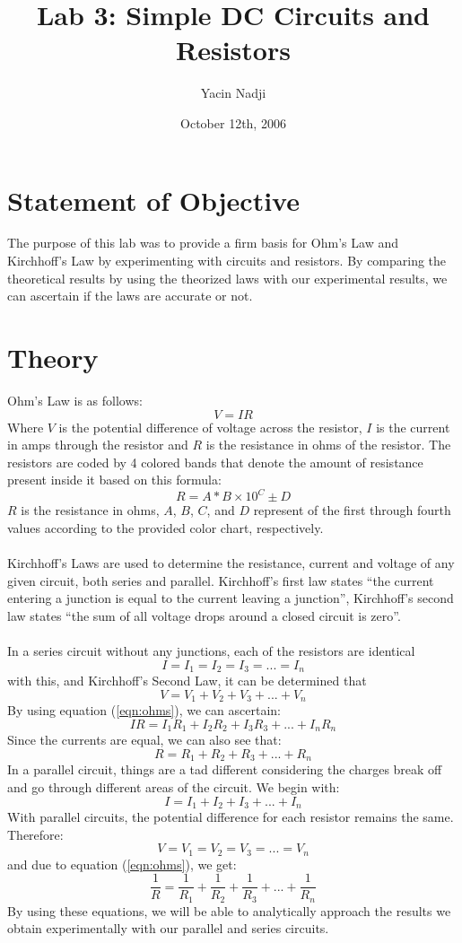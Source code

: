 \documentclass[titlepage]{article}
\title{Lab 3: Simple DC Circuits and Resistors}
\author{Yacin Nadji}
\date{October 12th, 2006}
\begin{document}
\maketitle

\section{Statement of Objective}\label{sec:obj}
The purpose of this lab was to provide a firm basis for Ohm's Law and Kirchhoff's Law by experimenting with circuits and resistors. By comparing the theoretical results by using the theorized laws with our experimental results, we can ascertain if the laws are accurate or not.

\section{Theory}\label{sec:theory}
Ohm's Law is as follows:
\begin{equation} \label{eqn:ohms}
	V = IR
\end{equation}
Where $V$ is the potential difference of voltage across the resistor, $I$ is the current in amps through the resistor and $R$ is the resistance in ohms of the resistor. The resistors are coded by 4 colored bands that denote the amount of resistance present inside it based on this formula:
\begin{equation}
	R = A * B \times 10^C \pm D%
\end{equation}
$R$ is the resistance in ohms, $A$, $B$, $C$, and $D$ represent of the first through fourth values according to the provided color chart, respectively.\\
\\
Kirchhoff's Laws are used to determine the resistance, current and voltage of any given circuit, both series and parallel. Kirchhoff's first law states ``the current entering a junction is equal to the current leaving a junction'', Kirchhoff's second law states ``the sum of all voltage drops around a closed circuit is zero''.\\
\\
In a series circuit without any junctions, each of the resistors are identical
\[
I = I_1 = I_2 = I_3 = ... = I_n
\]
with this, and Kirchhoff's Second Law, it can be determined that
\[
	V = V_1 + V_2 + V_3 + ... + V_n
\]
By using equation (\ref{eqn:ohms}), we can ascertain:
\[
	IR = I_1R_1 + I_2R_2 + I_3R_3 + ... + I_nR_n
\]
Since the currents are equal, we can also see that:
\[
	R = R_1 + R_2 + R_3 + ... + R_n
\]
In a parallel circuit, things are a tad different considering the charges break off and go through different areas of the circuit. We begin with:
\[
	I = I_1 + I_2 + I_3 + ... + I_n
\]
With parallel circuits, the potential difference for each resistor remains the same. Therefore:
\[
	V = V_1 = V_2 = V_3 = ... = V_n
\]
and due to equation (\ref{eqn:ohms}), we get:
\begin{equation}\label{eqn:law2}
	\frac{1}{R} = \frac{1}{R_1} + \frac{1}{R_2} + \frac{1}{R_3} + ... + \frac{1}{R_n}
\end{equation}
By using these equations, we will be able to analytically approach the results we obtain experimentally with our parallel and series circuits.
\end{document}
